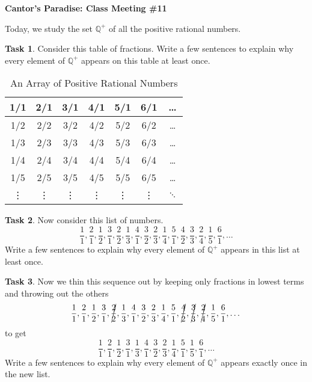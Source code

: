 \documentclass[12pt]{amsart}
\theoremstyle{definition}
\newtheorem{task}{Task}
\begin{document}
\begin{center}
\textbf{\Huge
Cantor's Paradise: Class Meeting \#11
}
\end{center}


\vspace{.5in}

Today, we study the set $\mathbb{Q}^+$ of all the positive rational numbers.

\begin{task}
Consider this table of fractions. Write a few sentences to explain why every element of $\mathbb{Q}^+$ appears on this table at least once.
\begin{table}[htp]
\begin{center}
\begin{tabular}{|c|c|c|c|c|c|c|}
\hline
1/1 & 2/1 & 3/1 & 4/1& 5/1 & 6/1& \dots \\
\hline
1/2 & 2/2 & 3/2 & 4/2 & 5/2 & 6/2& \dots \\
\hline
1/3 & 2/3 & 3/3 & 4/3 & 5/3 & 6/3& \dots \\
\hline
1/4 & 2/4 & 3/4 & 4/4 & 5/4 & 6/4& \dots \\
\hline
1/5 & 2/5 & 3/5 & 4/5 & 5/5 & 6/5& \dots \\
\hline
\vdots & \vdots & \vdots & \vdots & \vdots & \vdots & $\ddots$ \\
\hline
\end{tabular}
\end{center}
\label{default}
\caption{An Array of Positive Rational Numbers}
\end{table}%
\end{task}

\vspace{2in}

\begin{task} Now consider this list of numbers.
\[
\frac{1}{1}, \frac{2}{1}, \frac{1}{2}, \frac{3}{1}, \frac{2}{2}, \frac{1}{3}, \frac{4}{1}, \frac{3}{2}, \frac{2}{3}, \frac{1}{4}, \frac{5}{1}, \frac{4}{2}, \frac{3}{3}, \frac{2}{4}, \frac{1}{5}, \frac{6}{1}, \dots
\]
Write a few sentences to explain why every element of $\mathbb{Q}^+$ appears in this list at least once.\\
\end{task}

\clearpage

\begin{task}
Now we thin this sequence out by keeping only fractions in lowest terms and throwing out the others
\[
\frac{1}{1}, \frac{2}{1}, \frac{1}{2}, \frac{3}{1}, \cancel{\frac{2}{2}}, \frac{1}{3}, \frac{4}{1}, \frac{3}{2}, \frac{2}{3}, \frac{1}{4}, \frac{5}{1}, \cancel{\frac{4}{2}}, \cancel{\frac{3}{3}}, \cancel{\frac{2}{4}}, \frac{1}{5}, \frac{6}{1}, \dots
\]
to get
\[
\frac{1}{1}, \frac{2}{1}, \frac{1}{2}, \frac{3}{1}, \frac{1}{3}, \frac{4}{1}, \frac{3}{2}, \frac{2}{3}, \frac{1}{4}, \frac{5}{1}, \frac{1}{5}, \frac{6}{1}, \dots
\]
Write a few sentences to explain why every element of $\mathbb{Q}^+$ appears exactly once in the new list.\\
\end{task}
\end{document}
